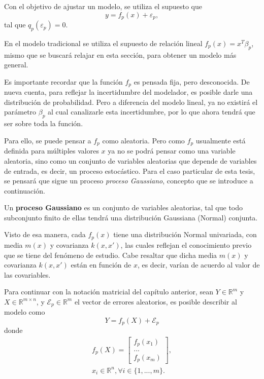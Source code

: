Con el objetivo de ajustar un modelo, se utiliza el supuesto que
\begin{equation*}
    y = f_p(x) + \varepsilon_p,
\end{equation*}
tal que $q_p(\varepsilon_p)=0$. 

En el modelo tradicional se utiliza el supuesto de relaci\'on lineal $f_p(x) = x^T\beta_p$, mismo que se buscar\'a relajar en esta secci\'on, para obtener un modelo m\'as general.

Es importante recordar que la función $f_p$ es pensada fija, pero desconocida. De nueva cuenta, para reflejar la incertidumbre del modelador, es posible darle una distribución de probabilidad. Pero a diferencia del modelo lineal, ya no existir\'a el parámetro $\beta_p$ al cual canalizarle esta incertidumbre, por lo que ahora tendrá que ser sobre toda la función.

Para ello, se puede pensar a $f_p$ como aleatoria. Pero como $f_p$ usualmente est\'a definida para m\'ultiples valores $x$ ya no se podr\'a pensar como una variable aleatoria, sino como un conjunto de variables aleatorias que depende de variables de entrada, es decir, un proceso estoc\'astico. Para el caso particular de esta tesis, se pensar\'a que sigue un proceso \textit{proceso Gaussiano}, concepto que se introduce a continuaci\'on.

\begin{defin}
    Un \textbf{proceso Gaussiano} es un conjunto de variables aleatorias, tal que todo subconjunto finito de ellas tendr\'a una distribuci\'on Gaussiana (Normal) conjunta.
\end{defin}

Visto de esa manera, cada $f_p(x)$ tiene una distribuci\'on Normal univariada, con media $m(x)$ y covarianza $k(x,x')$, las cuales reflejan el conocimiento previo que se tiene del fenómeno de estudio. Cabe resaltar que dicha media $m(x)$ y covarianza $k(x,x')$ están en función de $x$, es decir, var\'ian de acuerdo al valor de las covariables. 

Para continuar con la notación matricial del cap\'itulo anterior, sean $Y \in \mathbb{R}^m$ y $X \in \mathbb{R}^{m \times n}$, y $\mathcal{E}_p \in \mathbb{R}^m$ el vector de errores aleatorios, es posible describir al modelo como
\begin{equation*}
    Y = f_p(X) + \mathcal{E}_p
\end{equation*}
donde
\begin{equation*}
\begin{aligned}
    f_p(X) =     
    \left[
        \begin{array}{c}
        f_p(x_1)  \\
        ... \\
        f_p(x_m)
        \end{array}
    \right], \\
    x_i \in \mathbb{R}^n, \forall i \in \{1,...,m\}.
\end{aligned}
\end{equation*}

